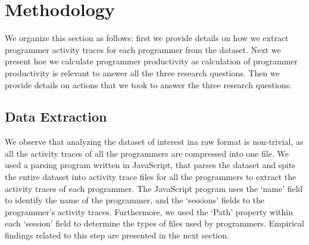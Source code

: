 \section{Methodology}
We organize this section as follows: first we provide details 
on how we extract programmer activity traces for each programmer from the dataset.
Next we present hoe we calculate programmer productivity as calculation of programmer productivity is relevant to answer all the three research questions. 
Then we provide details on actions that we took to answer the three research questions.   
%
%

\subsection{Data Extraction}
\label{dataextract}
We observe that analyzing the dataset of interest ina raw format is non-trivial, as all the activity traces of all the programmers are compressed into one file. We used a parsing program written in JavaScript, that parses the dataset and spits the entire dataset into activity trace files for all the programmers to extract the activity traces of each programmer. The JavaScript program uses the `name' field to identify the name of the programmer, and the `sessions' fields to the programmer's activity traces. Furthermore, we used the `Path' property within each `session' field to determine the types of files used by programmers. Empirical findings related to this step are presented in the next section.  


